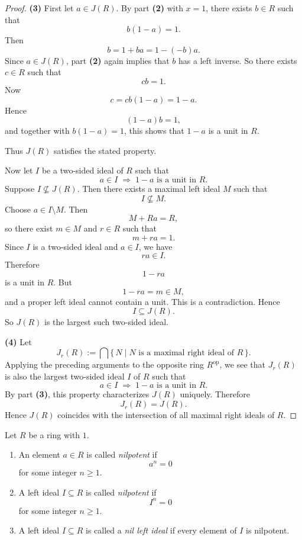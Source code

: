\begin{proof}
    \medskip

    \textbf{(3)} First let $a\in J(R)$. By part \textbf{(2)} with $x=1$, there exists $b\in R$ such that
    \[
        b(1-a)=1.
    \]
    Then
    \[
        b=1+ba=1-(-b)a.
    \]
    Since $a\in J(R)$, part \textbf{(2)} again implies that $b$ has a left inverse. So there exists $c\in R$ such that
    \[
        cb=1.
    \]
    Now
    \[
        c=cb(1-a)=1-a.
    \]
    Hence
    \[
        (1-a)b=1,
    \]
    and together with $b(1-a)=1$, this shows that $1-a$ is a unit in $R$.

    Thus $J(R)$ satisfies the stated property.

    Now let $I$ be a two-sided ideal of $R$ such that
    \[
        a\in I \;\Longrightarrow\; 1-a \text{ is a unit in }R.
    \]
    Suppose $I\not\subseteq J(R)$. Then there exists a maximal left ideal $M$ such that
    \[
        I\not\subseteq M.
    \]
    Choose $a\in I\setminus M$. Then
    \[
        M+Ra=R,
    \]
    so there exist $m\in M$ and $r\in R$ such that
    \[
        m+ra=1.
    \]
    Since $I$ is a two-sided ideal and $a\in I$, we have
    \[
        ra\in I.
    \]
    Therefore
    \[
        1-ra
    \]
    is a unit in $R$. But
    \[
        1-ra=m\in M,
    \]
    and a proper left ideal cannot contain a unit. This is a contradiction. Hence
    \[
        I\subseteq J(R).
    \]
    So $J(R)$ is the largest such two-sided ideal.

    \medskip

    \textbf{(4)} Let
    \[
        J_r(R):=\bigcap \{\,N\mid N \text{ is a maximal right ideal of }R\,\}.
    \]
    Applying the preceding arguments to the opposite ring $R^{\operatorname{op}}$, we see that $J_r(R)$ is also the largest two-sided ideal $I$ of $R$ such that
    \[
        a\in I \;\Longrightarrow\; 1-a \text{ is a unit in }R.
    \]
    By part \textbf{(3)}, this property characterizes $J(R)$ uniquely. Therefore
    \[
        J_r(R)=J(R).
    \]
    Hence $J(R)$ coincides with the intersection of all maximal right ideals of $R$.
\end{proof}

\begin{definition}
    Let $R$ be a ring with $1$.

    \begin{enumerate}
        \item An element $a\in R$ is called \emph{nilpotent} if
              \[
                  a^n=0
              \]
              for some integer $n\ge 1$.

        \item A left ideal $I\subseteq R$ is called \emph{nilpotent} if
              \[
                  I^n=0
              \]
              for some integer $n\ge 1$.

        \item A left ideal $I\subseteq R$ is called a \emph{nil left ideal} if every element of $I$
              is nilpotent.
    \end{enumerate}
\end{definition}

